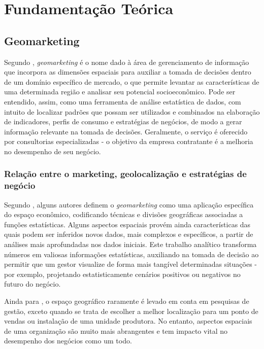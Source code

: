 
\chapter{Fundamentação Teórica}
\label{fundamentacao-teorica}

\section{Geomarketing}
\label{Geom}
Segundo , \emph{geomarketing} é o nome dado à área de
gerenciamento de informação que incorpora as dimensões espaciais para auxiliar a
tomada de decisões dentro de um domínio específico de mercado, o que permite
levantar as características de uma determinada região e analisar seu potencial
socioeconômico. Pode ser entendido, assim, como uma ferramenta de análise
estatística de dados, com intuito de localizar padrões que possam ser utilizados
e combinados na elaboração de indicadores, perfis de consumo e estratégias de
negócios, de modo a gerar informação relevante na tomada de decisões.
Geralmente, o serviço é oferecido por consultorias especializadas - o  objetivo
da empresa contratante é a melhoria no desempenho de seu negócio.

\subsection{Relação entre o marketing, geolocalização e estratégias de negócio}
Segundo , alguns autores definem o \emph{geomarketing} como uma aplicação específica do espaço econômico, codificando técnicas e divisões geográficas associadas a funções estatísticas. Alguns aspectos espaciais provém ainda características das quais podem ser inferidos novos dados, mais complexos e específicos, a partir de análises mais aprofundadas nos dados iniciais. Este trabalho analítico transforma números em valiosas informações estatísticas, auxiliando na tomada de decisão ao permitir que um gestor visualize de forma mais tangível determinadas situações - por exemplo, projetando estatisticamente cenários positivos ou negativos no futuro do negócio.

Ainda para , o espaço geográfico raramente é levado em conta em pesquisas de gestão, exceto quando se trata de escolher a melhor localização para um ponto de vendas ou instalação de uma unidade produtora. No entanto, aspectos espaciais de uma organização são muito mais abrangentes e tem impacto vital no desempenho dos negócios como um todo. 

